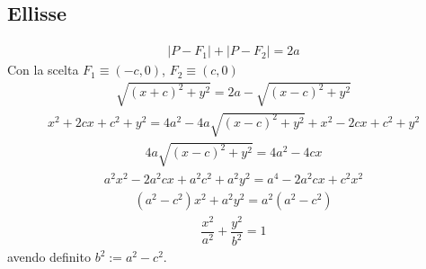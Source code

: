 \documentclass[letterpaper,10pt,english]{jupyterBook}
\begin{document}
\subsection{Ellisse}
\label{\detokenize{ch/analytic_geometry/analytic_geometry_2d/conics-cartesian:ellisse}}\begin{equation*}
\begin{split}|P - F_1| + |P - F_2| = 2a\end{split}
\end{equation*}
\sphinxAtStartPar
Con la scelta \(F_1 \equiv (-c,0)\), \(F_2 \equiv (c,0)\)
\begin{equation*}
\begin{split}\sqrt{(x+c)^2 + y^2} = 2a - \sqrt{(x-c)^2 + y^2}\end{split}
\end{equation*}\begin{equation*}
\begin{split}x^2 + 2 c x + c^2 + y^2 = 4 a^2 - 4a \sqrt{(x-c)^2 + y^2} + x^2 - 2 c x + c^2 + y^2\end{split}
\end{equation*}\begin{equation*}
\begin{split}4a \sqrt{(x-c)^2 + y^2} = 4 a^2 - 4 c x\end{split}
\end{equation*}\begin{equation*}
\begin{split}a^2 x^2-2 a^2 c x + a^2 c^2 + a^2 y^2 = a^4 - 2 a^2 c x + c^2 x^2\end{split}
\end{equation*}\begin{equation*}
\begin{split}(a^2 - c^2)x^2 + a^2 y^2 = a^2 ( a^2 - c^2 )\end{split}
\end{equation*}\begin{equation*}
\begin{split}\dfrac{x^2}{a^2} + \dfrac{y^2}{b^2} = 1\end{split}
\end{equation*}
\sphinxAtStartPar
avendo definito \(b^2 := a^2 - c^2\).
\end{document}

